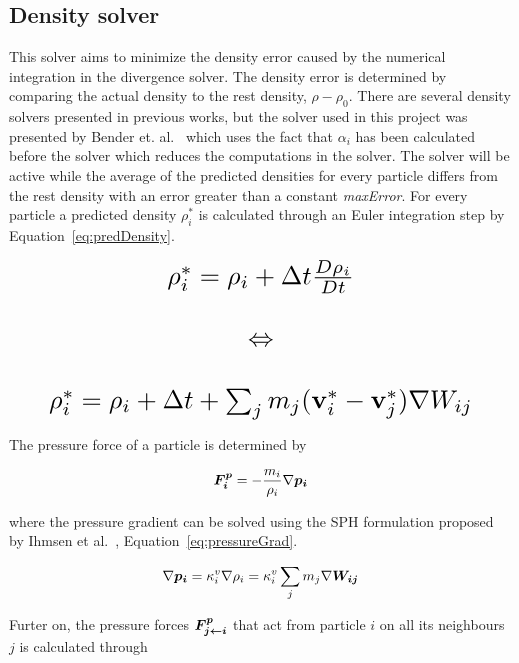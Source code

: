 \subsection{Density solver} \label{densitySolver}
    This solver aims to minimize the density error caused by the numerical integration in the divergence solver. The density error is determined by comparing the actual density to the rest density, $\rho - \rho_0$. There are several density solvers presented in previous works, but the solver used in this project was presented by Bender et. al.~\cite{bender} which uses the fact that $\alpha_i$ has been calculated before the solver which reduces the computations in the solver. The solver will be active while the average of the predicted densities for every particle differs from the rest density with an error greater than a constant \textit{maxError}. For every particle a predicted density $\rho_i^*$ is calculated through an Euler integration step by Equation~\ref{eq:predDensity}.

    \begin{equation} \label{eq:predDensity}
        \resizebox{0.88\linewidth}{!}{$
        \begin{matrix}
        \rho_i^* = \rho_i + \Delta t \frac{D\rho_i}{Dt} \\ 
        \\
        \Leftrightarrow \\ 
        \\
        \rho_i^* = \rho_i + \Delta t + \sum_j m_j 
        (\textbf{v}_i^* - \textbf{v}_j^*) \nabla W_{ij}
        \end{matrix}
        $}
    \end{equation}

    The pressure force of a particle is determined by 

    \begin{equation} \label{eq:pressure}
        \bm{F_i^p} = -\frac{m_i}{\rho_i}\nabla \bm{p_i}
    \end{equation}

    where the pressure gradient can be solved using the SPH formulation proposed by Ihmsen et al.~\cite{ihmsen}, Equation~\ref{eq:pressureGrad}.

    \begin{equation} \label{eq:pressureGrad}
        \nabla \bm{p_i} = \kappa_i^v \nabla \rho_i = \kappa_i^v \sum_j m_j \nabla \bm{W_{ij}}
    \end{equation}

    Furter on, the pressure forces $\bm{F_{j\leftarrow i}^p} $ that act from particle $i$ on all its neighbours $j$ is calculated through


